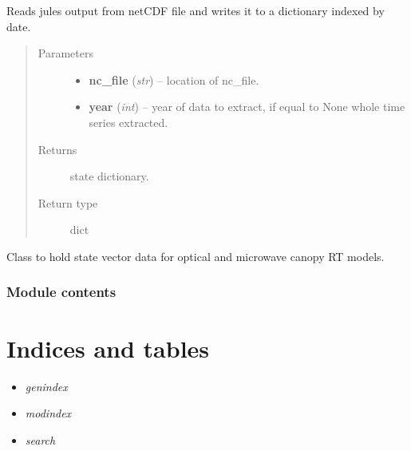 \documentclass[letterpaper,10pt,english]{sphinxmanual}
\begin{document}
\begin{fulllineitems}
\label{source/sentinelSimulator:sentinelSimulator.stateVector.read_jules}
Reads jules output from netCDF file and writes it to a dictionary indexed by date.
\begin{quote}\begin{description}
\item[{Parameters}] \leavevmode\begin{itemize}
\item {} 
\textbf{nc\_file} (\emph{str}) -- location of nc\_file.

\item {} 
\textbf{year} (\emph{int}) -- year of data to extract, if equal to None whole time series extracted.

\end{itemize}

\item[{Returns}] \leavevmode
state dictionary.

\item[{Return type}] \leavevmode
dict

\end{description}\end{quote}

\end{fulllineitems}


\begin{fulllineitems}
\label{source/sentinelSimulator:sentinelSimulator.stateVector.stateVector}
Class to hold state vector data for optical
and microwave canopy RT models.

\end{fulllineitems}



\subsection{Module contents}
\label{source/sentinelSimulator:module-sentinelSimulator}\label{source/sentinelSimulator:module-contents}

\chapter{Indices and tables}
\label{index:indices-and-tables}\begin{itemize}
\item {} 
\emph{genindex}

\item {} 
\emph{modindex}

\item {} 
\emph{search}

\end{itemize}
\end{document}
